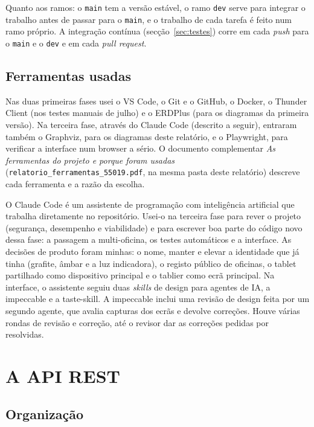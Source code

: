 \documentclass[a4paper,12pt]{article}
\begin{document}
Quanto aos ramos: o \texttt{main} tem a versão estável, o ramo \texttt{dev} serve para integrar o trabalho antes de passar para o \texttt{main}, e o trabalho de cada tarefa é feito num ramo próprio. A integração contínua (secção~\ref{sec:testes}) corre em cada \textit{push} para o \texttt{main} e o \texttt{dev} e em cada \textit{pull request}.

\subsection{Ferramentas usadas}

Nas duas primeiras fases usei o VS Code, o Git e o GitHub, o Docker, o Thunder Client (nos testes manuais de julho) e o ERDPlus (para os diagramas da primeira versão). Na terceira fase, através do Claude Code (descrito a seguir), entraram também o Graphviz, para os diagramas deste relatório, e o Playwright, para verificar a interface num browser a sério. O documento complementar \textit{As ferramentas do projeto e porque foram usadas} (\texttt{relatorio\_ferramentas\_55019.pdf}, na mesma pasta deste relatório) descreve cada ferramenta e a razão da escolha.

O Claude Code é um assistente de programação com inteligência artificial que trabalha diretamente no repositório. Usei-o na terceira fase para rever o projeto (segurança, desempenho e viabilidade) e para escrever boa parte do código novo dessa fase: a passagem a multi-oficina, os testes automáticos e a interface. As decisões de produto foram minhas: o nome, manter e elevar a identidade que já tinha (grafite, âmbar e a luz indicadora), o registo público de oficinas, o tablet partilhado como dispositivo principal e o tablier como ecrã principal. Na interface, o assistente seguiu duas \textit{skills} de design para agentes de IA, a impeccable e a taste-skill. A impeccable inclui uma revisão de design feita por um segundo agente, que avalia capturas dos ecrãs e devolve correções. Houve várias rondas de revisão e correção, até o revisor dar as correções pedidas por resolvidas.

\section{A API REST}
\label{sec:api}

\subsection{Organização}
\end{document}
